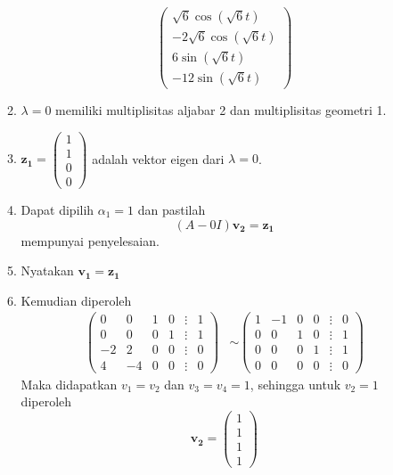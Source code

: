 \documentclass[a4paper]{article}
\theoremstyle{definisi}
\numberwithin{equation}{section}
\begin{document}
\begin{enumerate}
\begin{enumerate}[label=Langkah \arabic*: ,leftmargin=*]
\begin{equation*}
\begin{pmatrix}
          \sqrt{6}\cos(\sqrt{6}t)\\-2\sqrt{6}\cos(\sqrt{6}t)\\6\sin(\sqrt{6}t)\\-12\sin(\sqrt{6}t)
        \end{pmatrix}
      \end{equation*}
      \item $\lambda=0$ memiliki multiplisitas aljabar 2 dan multiplisitas geometri 1.
      \item $\mathbf{z_1}=\begin{pmatrix}
        1\\1\\0\\0
      \end{pmatrix}$ adalah vektor eigen dari $\lambda=0$.
      \item Dapat dipilih $\alpha_1=1$ dan pastilah
      \begin{equation*}
        (A-0I)\mathbf{v_2}=\mathbf{z_1}
      \end{equation*}
      mempunyai penyelesaian.
      \item Nyatakan $\mathbf{v_1}=\mathbf{z_1}$
      \item Kemudian diperoleh
      \begin{align*}
        \begin{pmatrix}
          0&0&1&0&\vdots&1\\
          0&0&0&1&\vdots&1\\
          -2&2&0&0&\vdots&0\\
          4&-4&0&0&\vdots&0
        \end{pmatrix}&\sim
        \begin{pmatrix}
          1&-1&0&0&\vdots&0\\
          0&0&1&0&\vdots&1\\
          0&0&0&1&\vdots&1\\
          0&0&0&0&\vdots&0
        \end{pmatrix}
      \end{align*}
      Maka didapatkan $v_1=v_2$ dan $v_3=v_4=1$, sehingga untuk $v_2=1$ diperoleh
      \begin{equation*}
        \mathbf{v_2}=\begin{pmatrix}
          1\\1\\1\\1
        \end{pmatrix}
      \end{equation*}

\end{enumerate}
\end{enumerate}
\end{document}
